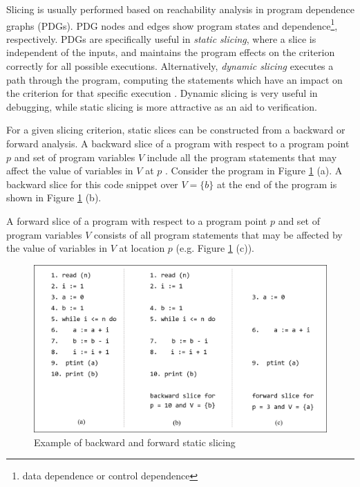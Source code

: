 Slicing is usually performed based on reachability analysis in program
dependence graphs (PDGs). PDG nodes and edges show program states and dependence\footnote{data dependence or control dependence}, respectively. PDGs are specifically useful in \emph{static slicing}, where
a slice is independent of the inputs,
 and maintains the program effects on the criterion
correctly for all possible executions. Alternatively,
\emph{dynamic slicing} executes a path through the program, computing the statements which have an impact on the criterion for that
specific execution \cite{Androutsopoulos}. Dynamic slicing is very useful in debugging, while static slicing is more attractive as an aid to verification.

For a given slicing criterion, static slices can be constructed from a backward or forward analysis.
A backward slice of a program with respect to a
program point $p$ and  set of program variables $V$ include all the program statements that may affect the value of variables in
$V$ at $p$ \cite{slcnote}. Consider the program in Figure \ref{fig:exslic} (a).
A backward slice for this code snippet over $V = \{b\}$ at the end of the program is shown in  Figure \ref{fig:exslic} (b). 

A forward slice of a program with respect to a
program point $p$ and set of program variables $V$
consists of all program statements that may be affected by the value of
variables in $V$ at location $p$ \cite{slcnote} (e.g.  Figure \ref{fig:exslic} (c)).


\begin{figure}
  \centering
  \includegraphics[width=\textwidth]{figs/exslic.png}
  \caption{Example of backward and forward static slicing}
 \label{fig:exslic}
\end{figure}


